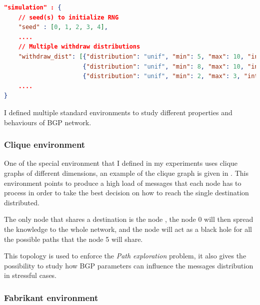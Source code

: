 \begin{lstlisting}[language=json, caption=Environment example with \num{15} possible runs, label=lst:environment_example]
"simulation" : {
    // seed(s) to initialize RNG
    "seed" : [0, 1, 2, 3, 4],
    ....
    // Multiple withdraw distributions
    "withdraw_dist": [{"distribution": "unif", "min": 5, "max": 10, "int": 0.1},
                      {"distribution": "unif", "min": 8, "max": 10, "int": 0.1},
                      {"distribution": "unif", "min": 2, "max": 3, "int": 0.1}],
    ....
}
\end{lstlisting}


I defined multiple standard environments to study different
properties and behaviours of \ac{BGP} network.

\subsubsection{Clique environment}
\label{subsec:clique_env}

One of the special environment that I defined in my experiments uses clique
graphs of different dimensions, an example of the clique graph is given in
.
This environment points to produce a high load of messages that each node has
to process in order to take the best decision on how to reach the single
destination distributed.

The only node that shares a destination is the node , the node
\num{0} will then spread the knowledge to the whole network, and the node
 will act as a black hole for all the possible paths
that the node \num{5} will share.

This topology is used to enforce the \textit{Path exploration} problem, it also
gives the possibility to study how \ac{BGP} parameters can influence the messages
distribution in stressful cases.

\subsubsection{Fabrikant environment}
\label{subsec:fabrikant_env}


